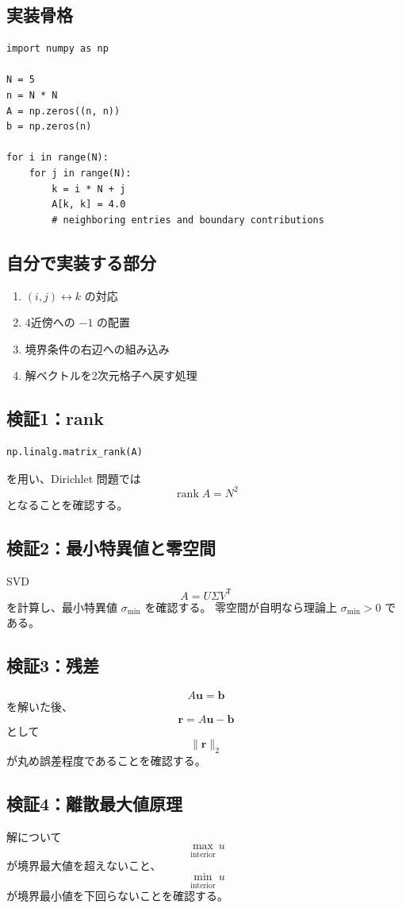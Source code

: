 \documentclass[a4paper,11pt]{ltjsarticle}
\newcommand{\rank}{\operatorname{rank}}
\begin{document}
\subsection{実装骨格}
\begin{verbatim}
import numpy as np

N = 5
n = N * N
A = np.zeros((n, n))
b = np.zeros(n)

for i in range(N):
    for j in range(N):
        k = i * N + j
        A[k, k] = 4.0
        # neighboring entries and boundary contributions
\end{verbatim}

\subsection{自分で実装する部分}
\begin{enumerate}
  \item $(i,j)\leftrightarrow k$ の対応
  \item 4近傍への $-1$ の配置
  \item 境界条件の右辺への組み込み
  \item 解ベクトルを2次元格子へ戻す処理
\end{enumerate}

\subsection{検証1：rank}
\begin{verbatim}
np.linalg.matrix_rank(A)
\end{verbatim}
を用い、Dirichlet 問題では
\[
\rank A=N^2
\]
となることを確認する。

\subsection{検証2：最小特異値と零空間}
SVD
\[
A=U\Sigma V^{\mathsf T}
\]
を計算し、最小特異値 $\sigma_{\min}$ を確認する。
零空間が自明なら理論上 $\sigma_{\min}>0$ である。

\subsection{検証3：残差}
\[
A\bm u=\bm b
\]
を解いた後、
\[
\bm r=A\bm u-\bm b
\]
として
\[
\|\bm r\|_2
\]
が丸め誤差程度であることを確認する。

\subsection{検証4：離散最大値原理}
解について
\[
\max_{\text{interior}}u
\]
が境界最大値を超えないこと、
\[
\min_{\text{interior}}u
\]
が境界最小値を下回らないことを確認する。
\end{document}
